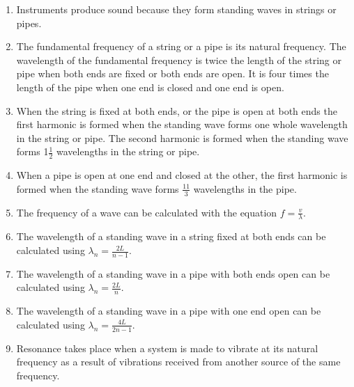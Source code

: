 \begin{enumerate}
\item Instruments produce sound because they form standing waves in strings or pipes.
\item The fundamental frequency of a string or a pipe is its natural frequency. The wavelength
of the fundamental frequency is twice the length of the string or pipe when both ends are fixed or both ends are open. It is four times the length of the pipe when one end is closed and one end is open.
\item When the string is fixed at both ends, or the pipe is open at both ends the first harmonic is formed when the standing wave forms one whole
wavelength in the string or pipe. The second harmonic is formed when the
standing wave forms 1$\frac{1}{2}$ wavelengths in the string or pipe.
\item When a pipe is open at one end and closed at the other, the first harmonic is formed when the standing wave forms $\frac{11}{3}$ wavelengths in the pipe.
\item The frequency of a wave can be calculated with the equation $f = \frac{v}{\lambda}$.
\item The wavelength of a standing wave in a string fixed at both ends can be calculated using
$\lambda_{n} = \frac{2L}{n-1}$.
\item The wavelength of a standing wave in a pipe with both ends open can be calculated using
$\lambda_{n} = \frac{2L}{n}$.
\item The wavelength of a standing wave in a pipe with one end open can be calculated using
$\lambda_{n} = \frac{4L}{2n-1}$.
\item Resonance takes place when a system is made to vibrate at its natural frequency as a
result of vibrations received from another source of the same frequency.
\end{enumerate}

